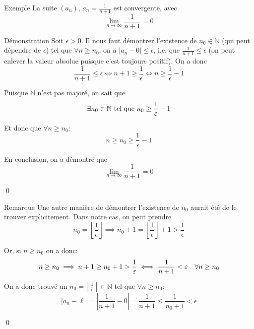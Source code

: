 \documentclass[a4paper]{article}
\begin{document}
\begin{parag}{Exemple}
    La suite $\left(a_n\right)$, $a_n = \frac{1}{n+1}$ est convergente, avec
    \[\lim_{n \to \infty} \frac{1}{n+1} = 0\]

    \begin{subparag}{Démonstration}
        Soit $\epsilon > 0$. Il nous faut démontrer l'existence de $n_0 \in \mathbb{N}$ (qui peut dépendre de $\epsilon$) tel que $\forall n \geq n_0$, on a $\left|a_n - 0\right| \leq \epsilon$, i.e. que $\frac{1}{n+1} \leq \epsilon$ (on peut enlever la valeur absolue puisque c'est toujours positif). On a donc 
        \[\frac{1}{n+1} \leq \epsilon \iff n+1 \geq \frac{1}{\epsilon} \iff n \geq \frac{1}{\epsilon} - 1\]
        
        Puisque $\mathbb{N}$ n'est pas majoré, on sait que 
        \[\exists n_0 \in \mathbb{N} \text{ tel que } n_0 \geq \frac{1}{\varepsilon} - 1\]
        
        Et donc que $\forall n \geq n_0$: 
        \[n \geq n_0 \geq \frac{1}{\epsilon} - 1\]
        

        En conclusion, on a démontré que 
        \[\lim_{n \to \infty} \frac{1}{n+1} = 0\]

        \qed
    \end{subparag}
    
    \begin{subparag}{Remarque}
        Une autre manière de démontrer l'existence de $n_0$ aurait été de le trouver explicitement. Dans notre cas, on peut prendre 
        \[n_0 = \left\lfloor \frac{1}{\epsilon} \right\rfloor \implies n_0 + 1 = \left\lfloor \frac{1}{\epsilon} \right\rfloor + 1 > \frac{1}{\epsilon}\]

        Or, si $n \geq n_0$ on a donc: 
        \[n \geq n_0 \implies n + 1 \geq n_0 + 1 > \frac{1}{\varepsilon} \iff \frac{1}{n+1} < \varepsilon \quad \forall n \geq n_0\]
        
        On a donc trouvé un $n_0 = \left\lfloor \frac{1}{\epsilon} \right\rfloor \in \mathbb{N}$ tel que $\forall n \geq n_0$: 
        \[\left|a_n - \ell\right| = \left|\frac{1}{n+1} - 0\right| = \frac{1}{n+1} \leq \frac{1}{n_0 + 1} < \epsilon \]
        
        \qed
    \end{subparag}
\end{parag}
\end{document}
